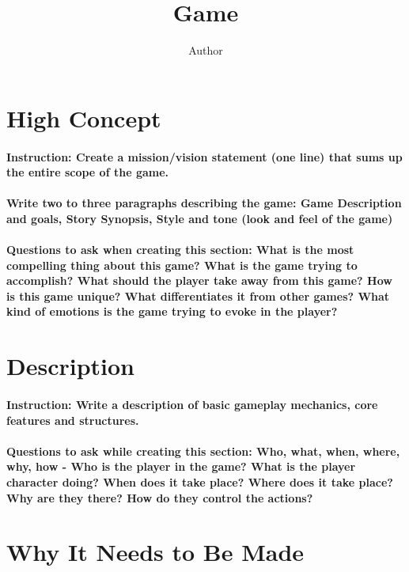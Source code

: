 \documentclass[12pt, twocolumn]{article}
\title{\vspace{-3.0cm}\titlefont Game}
\author{Author}
\date{}
\begin{document}
\maketitle

\section*{High Concept}
\paragraph{Instruction: Create a mission/vision statement (one line) that sums up the entire scope of the game.}

\paragraph{Write two to three paragraphs describing the game: Game Description and goals, Story Synopsis, Style and tone (look and feel of the game)}

\paragraph{Questions to ask when creating this section: What is the most compelling thing about this game? What is the game trying to accomplish? What should the player take away from this game? How is this game unique? What differentiates it from other games? What kind of emotions is the game trying to evoke in the player?}

\section*{Description}

\paragraph{Instruction: Write a description of basic gameplay mechanics, core features and structures.}

\paragraph{Questions to ask while creating this section: Who, what, when, where, why, how - Who is the player in the game? What is the player character doing? When does it take place? Where does it take place? Why are they there? How do they control the actions?}

\section*{Why It Needs to Be Made}
\end{document}
